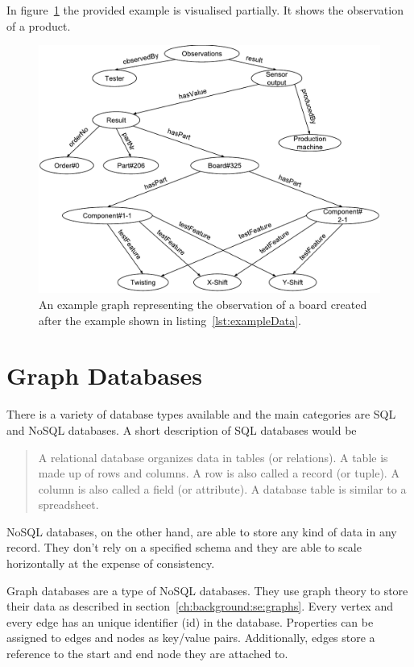 In figure~\ref{fig:exampleData} the provided example is visualised partially.
It shows the observation of a product.

\begin{figure}
  \centering
  \includegraphics[width=\textwidth]{images/design/exampleGraph}
  \caption{An example graph representing the observation of a board created after the example shown in listing~\ref{lst:exampleData}.}
  \label{fig:exampleData}
\end{figure}

\section{Graph Databases}
\label{ch:background:se:graphDatabases}
There is a variety of database types available and the main categories are SQL and NoSQL databases.
A short description of SQL databases would be
\blockquote[\cite{ChuaHock-Chuan}]{A relational database organizes data in tables (or relations).
A table is made up of rows and columns.
A row is also called a record (or tuple).
A column is also called a field (or attribute).
A database table is similar to a spreadsheet.}

NoSQL databases,
on the other hand,
are able to store any kind of data in any record.
They don't rely on a specified schema and they are able to scale horizontally at the expense of consistency.~\cite{Yegulalp2017}

Graph databases are a type of NoSQL databases.
They use graph theory to store their data as described in section~\ref{ch:background:se:graphs}.
Every vertex and every edge has an unique identifier (id) in the database.
Properties can be assigned to edges and nodes as key/value pairs.
Additionally,
edges store a reference to the start and end node they are attached to.~\cite{Rouse2016}

